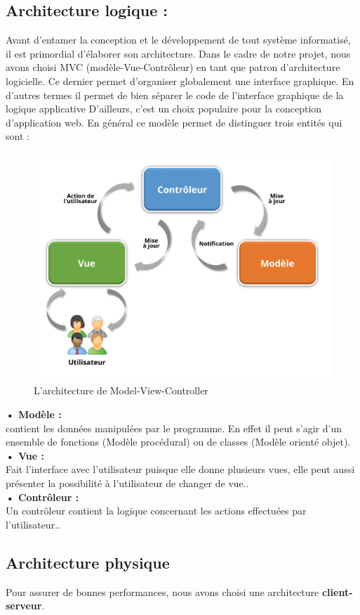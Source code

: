 \subsection{Architecture logique :}
Avant d’entamer la conception et le développement de tout système informatisé, il est primordial d’élaborer son architecture.  Dans le cadre de notre projet,
nous avons choisi MVC (modèle-Vue-Contrôleur) en tant que patron d’architecture logicielle. Ce dernier permet d’organiser globalement une interface
graphique. En d’autres termes il permet de bien séparer le code de l’interface
graphique de la logique applicative D’ailleurs, c’est un choix populaire pour la
conception d’application web. En général ce modèle permet de distinguer trois
entités qui sont :
\begin{figure}[H]
    \centering
    \includegraphics[width=0.6\linewidth]{projet/images/diagramme de sequance/images/Model-View-Controller.png}
    \caption{L’architecture de Model-View-Controller}
    \label{fig:equipe_scrum}
\end{figure}

\textbf{• Modèle :}\\
contient les données manipulées par le programme. En effet il peut s’agir
d’un ensemble de fonctions (Modèle procédural) ou de classes (Modèle
orienté objet).\\
\textbf{ • Vue :}\\
Fait l’interface avec l’utilisateur puisque elle donne plusieurs vues, elle
peut aussi présenter la possibilité à l’utilisateur de changer de vue..\\
\textbf{• Contrôleur :}\\
Un contrôleur contient la logique concernant les actions effectuées par
l’utilisateur..
\subsection{Architecture physique}
Pour assurer de bonnes performances, nous avons choisi une architecture
\textbf{client-serveur}.

